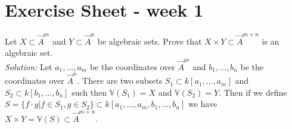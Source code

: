 \documentclass[../main/main.tex]{subfiles}
\begin{document}
\newcommand{\V}[1]{\mathbb V(#1)}
\newcommand{\I}[1]{\mathbf I(#1)}
\newcommand{\mc}[1]{\mathcal #1}

\chapter{Exercise Sheet - week 1}

\begin{ex}
Let $X\subset\vec A^m$ and $Y\subset \vec A^n$ be algebraic sets. Prove that $X\times Y\subset\vec A^{m+n}$ is an algebraic set. \\
%
\textit{Solution:}
%
Let $a_1,\dots,a_m$ be the coordinates over $\vec A^m$ and $b_1,\dots,b_n$ be the coordinates over $\vec A^n$. There are two subsets $S_1\subset k[a_1,\dots,a_m]$ and $S_2\subset k[b_1,\dots,b_n]$ such then $\V{S_1}=X$ and $\V{S_2}=Y$. Then if we define $S=\{f\cdot g\vert f\in S_1, g\in S_2\}\subset k[a_1,\dots,a_m,b_1,\dots,b_n]$ we have $X\times Y=\V S\subset\vec A^{m+n}$.

\end{ex}
\end{document}
